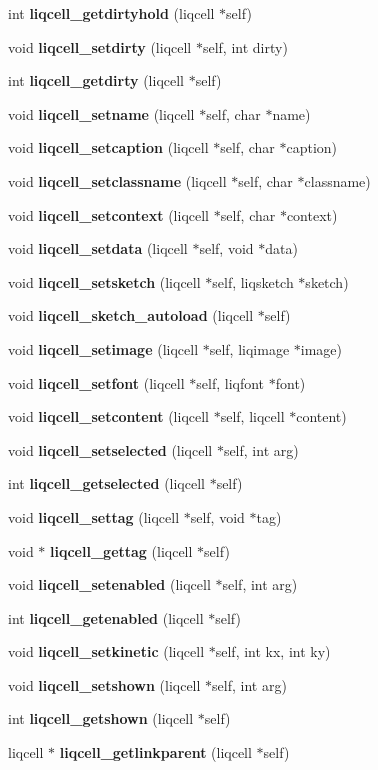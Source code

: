 \begin{CompactItemize}
\item 
int {\bf liqcell\_\-getdirtyhold} (liqcell $\ast$self)
\item 
void {\bf liqcell\_\-setdirty} (liqcell $\ast$self, int dirty)
\item 
int {\bf liqcell\_\-getdirty} (liqcell $\ast$self)
\item 
void {\bf liqcell\_\-setname} (liqcell $\ast$self, char $\ast$name)
\item 
void {\bf liqcell\_\-setcaption} (liqcell $\ast$self, char $\ast$caption)
\item 
void {\bf liqcell\_\-setclassname} (liqcell $\ast$self, char $\ast$classname)
\item 
void {\bf liqcell\_\-setcontext} (liqcell $\ast$self, char $\ast$context)
\item 
void {\bf liqcell\_\-setdata} (liqcell $\ast$self, void $\ast$data)
\item 
void {\bf liqcell\_\-setsketch} (liqcell $\ast$self, liqsketch $\ast$sketch)
\item 
void {\bf liqcell\_\-sketch\_\-autoload} (liqcell $\ast$self)
\item 
void {\bf liqcell\_\-setimage} (liqcell $\ast$self, liqimage $\ast$image)
\item 
void {\bf liqcell\_\-setfont} (liqcell $\ast$self, liqfont $\ast$font)
\item 
void {\bf liqcell\_\-setcontent} (liqcell $\ast$self, liqcell $\ast$content)
\item 
void {\bf liqcell\_\-setselected} (liqcell $\ast$self, int arg)
\item 
int {\bf liqcell\_\-getselected} (liqcell $\ast$self)
\item 
void {\bf liqcell\_\-settag} (liqcell $\ast$self, void $\ast$tag)
\item 
void $\ast$ {\bf liqcell\_\-gettag} (liqcell $\ast$self)
\item 
void {\bf liqcell\_\-setenabled} (liqcell $\ast$self, int arg)
\item 
int {\bf liqcell\_\-getenabled} (liqcell $\ast$self)
\item 
void {\bf liqcell\_\-setkinetic} (liqcell $\ast$self, int kx, int ky)
\item 
void {\bf liqcell\_\-setshown} (liqcell $\ast$self, int arg)
\item 
int {\bf liqcell\_\-getshown} (liqcell $\ast$self)
\item 
liqcell $\ast$ {\bf liqcell\_\-getlinkparent} (liqcell $\ast$self)
\item 

\end{CompactItemize}
